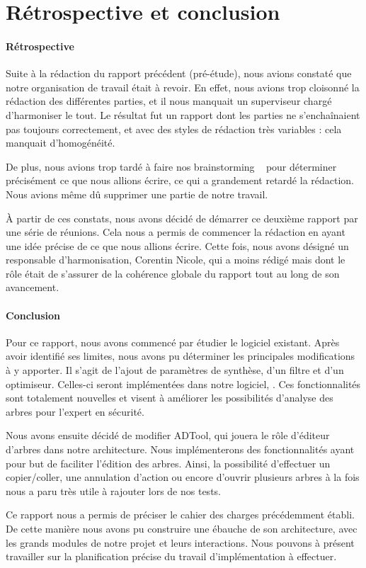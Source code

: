 \section{Rétrospective et conclusion}
	\paragraph{Rétrospective} Suite à la rédaction du rapport précédent (pré-étude), nous avions constaté que notre organisation de travail était à revoir. En effet, nous avions trop cloisonné la rédaction des différentes parties, et il nous manquait un superviseur chargé d'harmoniser le tout. Le résultat fut un rapport dont les parties ne s'enchaînaient pas toujours correctement, et avec des styles de rédaction très variables : cela manquait d'homogénéité.

	De plus, nous avions trop tardé à faire nos \og brainstorming \fg~ pour déterminer précisément ce que nous allions écrire, ce qui a grandement retardé la rédaction. Nous avions même dû supprimer une partie de notre travail.

	À partir de ces constats, nous avons décidé de démarrer ce deuxième rapport par une série de réunions. Cela nous a permis de commencer la rédaction en ayant une idée précise de ce que nous allions écrire. Cette fois, nous avons désigné un responsable d'harmonisation, Corentin {\sc Nicole}, qui a moins rédigé mais dont le rôle était de s'assurer de la cohérence globale du rapport tout au long de son avancement.

	\paragraph{Conclusion} Pour ce rapport, nous avons commencé par étudier le logiciel existant. Après avoir identifié ses limites, nous avons pu déterminer les principales modifications à y apporter. Il s'agit de l'ajout de paramètres de synthèse, d'un filtre et d'un optimiseur. Celles-ci seront implémentées dans notre logiciel, \glasir{}. Ces fonctionnalités sont totalement nouvelles et visent à améliorer les possibilités d'analyse des arbres pour l'expert en sécurité. 

	Nous avons ensuite décidé de modifier ADTool, qui jouera le rôle d'éditeur d'arbres dans notre architecture. Nous implémenterons des fonctionnalités ayant pour but de faciliter l'édition des arbres. Ainsi, la possibilité d'effectuer un copier/coller, une annulation d'action ou encore d'ouvrir plusieurs arbres à la fois nous a paru très utile à rajouter lors de nos tests.

	Ce rapport nous a permis de préciser le cahier des charges précédemment établi. De cette manière nous avons pu construire une ébauche de son architecture, avec les grands modules de notre projet et leurs interactions. Nous pouvons à présent travailler sur la planification précise du travail d'implémentation à effectuer.